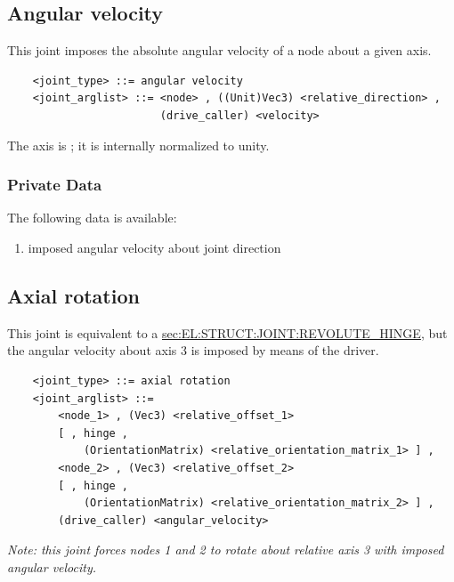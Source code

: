\subsection{Angular velocity}
This joint imposes the absolute angular velocity of a node
about a given axis.
\begin{verbatim}
    <joint_type> ::= angular velocity
    <joint_arglist> ::= <node> , ((Unit)Vec3) <relative_direction> , 
                        (drive_caller) <velocity>
\end{verbatim}
The axis is ; it is internally normalized to unity.

\subsubsection{Private Data}
The following data is available:
\begin{enumerate}
\item {} imposed angular velocity about joint direction
\end{enumerate}

\subsection{Axial rotation}
\label{sec:EL:STRUCT:JOINT:AXIAL_ROTATION}
This joint is equivalent to a
\hyperref{\kw{revolute hinge}}{\kw{revolute hinge} (see Section~}{)}{sec:EL:STRUCT:JOINT:REVOLUTE_HINGE},
but the angular velocity about axis 3 is imposed by means of the driver.
\begin{verbatim}
    <joint_type> ::= axial rotation
    <joint_arglist> ::= 
        <node_1> , (Vec3) <relative_offset_1> 
        [ , hinge , 
            (OrientationMatrix) <relative_orientation_matrix_1> ] ,
        <node_2> , (Vec3) <relative_offset_2>
        [ , hinge , 
            (OrientationMatrix) <relative_orientation_matrix_2> ] ,
        (drive_caller) <angular_velocity>
\end{verbatim}
{\em
    Note: this joint forces nodes 1 and 2 to rotate about relative 
    axis 3 with imposed angular velocity.
}

